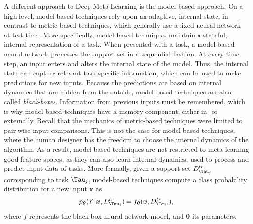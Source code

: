 A  different approach to Deep Meta-Learning is the model-based approach. On a high level, model-based techniques rely upon an adaptive, internal state, in contrast to metric-based techniques, which generally use a fixed neural network at test-time.
More specifically, model-based techniques maintain a stateful, internal representation of a task. When presented with a task, a model-based neural network processes the support set in a sequential fashion. At every time step, an input enters and alters the internal state of the model. Thus, the internal state can capture relevant task-specific information, which can be used to make predictions for new inputs.
Because the predictions are based on internal dynamics that are hidden from the outside, model-based techniques are also called \textit{black-boxes}. Information from previous inputs must be remembered, which is why model-based techniques have a memory component, either in- or externally. 
Recall that the mechanics of metric-based techniques were limited to pair-wise input comparisons. This is not the case for model-based techniques, where the human designer has the freedom to choose the internal dynamics of the algorithm. As a result, model-based techniques are not restricted to meta-learning good feature spaces, as they can also learn internal dynamics, used to process and predict input data of tasks.
More formally, given a support set $D^{tr}_{\Tau_{j}}$ corresponding to task $\Tau_{j}$, model-based techniques compute a class probability distribution for a new input $\boldsymbol{x}$ as  
\begin{align}
    p_{\boldsymbol{\theta}}(Y|\boldsymbol{x}, D^{tr}_{\Tau_{j}}) = f_{\boldsymbol{\theta}}(\boldsymbol{x}, D^{tr}_{\Tau_{j}}),
\end{align}
where $f$ represents the black-box neural network model, and $\boldsymbol{\theta}$ its parameters.


